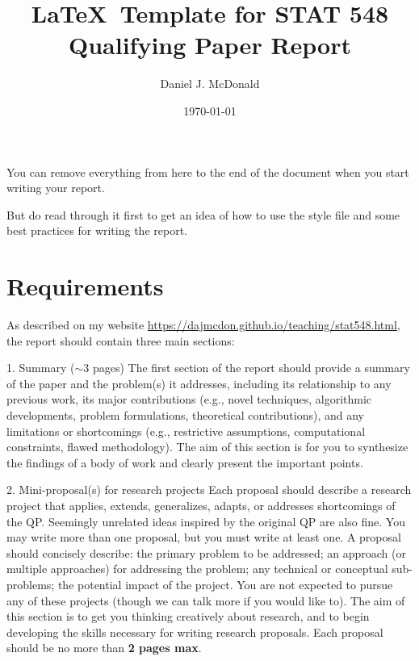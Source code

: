 \documentclass[12pt]{article}
\title{\LaTeX\ Template for STAT 548 Qualifying Paper Report} %
\author{Daniel J. McDonald} %
\date{\today} %
\begin{document}
\maketitle

You can remove everything from here to the end of the document when you start
writing your report.

But do read through it first to get an idea of how to use the style file and 
some best practices for writing the report.

\section{Requirements}\label{sec:req}

As described on my website
\url{https://dajmcdon.github.io/teaching/stat548.html}, the report should
contain three main sections:

\bdesc
\item[1. Summary ($\sim$3 pages)] The first section of the report should provide a
summary of the paper and the problem(s) it addresses, including its relationship
to any previous work, its major contributions (e.g., novel techniques,
algorithmic developments, problem formulations, theoretical contributions), and
any limitations or shortcomings (e.g., restrictive assumptions, computational
constraints, flawed methodology). The aim of this section is for you to
synthesize the findings of a body of work and clearly present the important
points.

\item[2. Mini-proposal(s) for research projects] Each proposal should describe a
research project that applies, extends, generalizes, adapts, or addresses
shortcomings of the QP. Seemingly unrelated ideas inspired by the original QP
are also fine. You may write more than one proposal, but you must write at least
one. A proposal should concisely describe: the primary problem to be addressed;
an approach (or multiple approaches) for addressing the problem; any technical
or conceptual sub-problems; the potential impact of the project. You are not
expected to pursue any of these projects (though we can talk more if you would
like to). The aim of this section is to get you thinking creatively about
research, and to begin developing the skills necessary for writing research
proposals. Each proposal should be no more than \textbf{2 pages max}.
\end{document}
